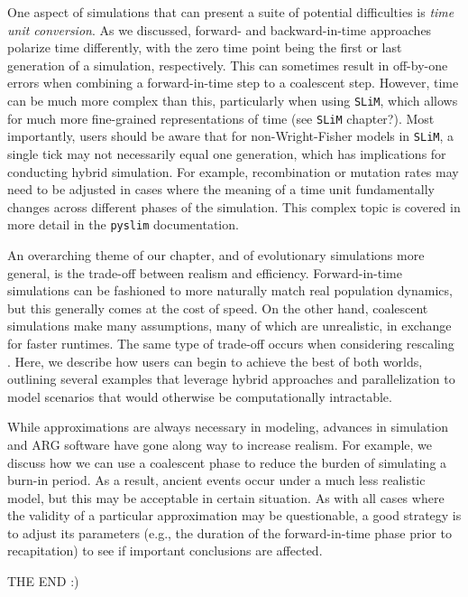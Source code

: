 \documentclass[12pt]{article}
\newcommand{\slim}[0]{\texttt{SLiM}\xspace}
\newcommand{\pyslim}[0]{\texttt{pyslim}\xspace}
\begin{document}
One aspect of simulations that can present a suite of potential difficulties is \emph{time unit conversion}. As we discussed, forward- and backward-in-time approaches polarize time
differently, with the zero time point being the first or last generation of a simulation, respectively. This can sometimes result in off-by-one errors when combining a forward-in-time
step to a coalescent step. However, time can be much more complex than this, particularly when using \slim, which allows for much more fine-grained representations of time
(see \slim chapter?). Most importantly, users should be aware that for non-Wright-Fisher models in \slim, a single tick may not necessarily equal one generation, which has
implications for conducting hybrid simulation. For example, recombination or mutation rates may need to be adjusted in cases where the meaning of a time unit fundamentally
changes across different phases of the simulation. This complex topic is covered in more detail in the \pyslim documentation.

An overarching theme of our chapter, and of evolutionary simulations more general, is the trade-off between realism and efficiency. Forward-in-time simulations can be fashioned to
more naturally match real population dynamics, but this generally comes at the cost of speed. On the other hand, coalescent simulations make many assumptions, many of which
are unrealistic, in exchange for faster runtimes. The same type of trade-off occurs when considering rescaling \citep{cury_simulation_2022,dabi_population_2025}. Here, we describe
how users can begin to achieve the best of both worlds, outlining several examples that leverage hybrid approaches and parallelization to model scenarios that would otherwise be
computationally intractable.

While approximations are always necessary in modeling, advances in simulation and ARG software have gone along way to increase realism. For example, we discuss how we
can use a coalescent phase to reduce the burden of simulating a burn-in period. As a result, ancient events occur under a much less realistic model, but this may be acceptable in
certain situation. As with all cases where the validity of a particular approximation may be questionable, a good strategy is to adjust its parameters (e.g., the duration of the
forward-in-time phase prior to recapitation) to see if important conclusions are affected.






THE END :)
\end{document}
